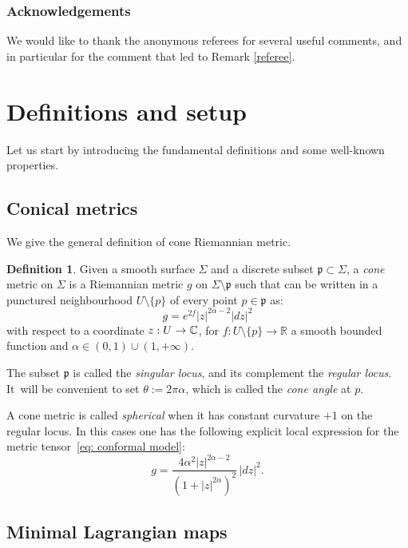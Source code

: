 \documentclass[11pt]{article}
\theoremstyle{definition}
\newtheorem{defi}[cor]{Definition}
\newcommand{\R}{{\mathbb R}}
\begin{document}
\subsubsection*{Acknowledgements}
We would like to thank the anonymous referees for several useful comments, and in particular for the comment that led to Remark \ref{referee}.

\section{Definitions and setup}

Let us start by introducing the fundamental definitions and some well-known properties.

\subsection{Conical metrics}
We give the general definition of cone Riemannian metric.

\begin{defi} \label{defi cone sing}
Given a smooth surface $\Sigma$ and a discrete subset $\mathfrak p\subset \Sigma$, a \emph{cone} metric on $\Sigma$ is a Riemannian metric $g$ on $\Sigma\setminus \mathfrak p$ such that can be written in a punctured neighbourhood $U\setminus\{p\}$ of every point $p\in \mathfrak p$ as:
\begin{equation} \label{eq: conformal model}
g=e^{2f}|z|^{2\alpha-2}|dz|^2
\end{equation}
with respect to a coordinate $z:U\to{\mathbb C}$, for $f:U\setminus \{p\}\to\R$ a smooth bounded function and $\alpha\in (0,1)\cup (1,+\infty)$.
\end{defi}

The subset $\mathfrak p$ is called the \emph{singular locus}, and its complement the \emph{regular locus}. It~will be convenient to set $\theta:=2\pi\alpha$, which is called the \emph{cone angle} at $p$.

A cone metric is called \emph{spherical} when it has constant curvature $+1$ on the regular locus. In this cases one has the following explicit local expression for the metric tensor~\eqref{eq: conformal model}:
\begin{equation}\label{eq:spherical cone metric}
g=\frac{4\alpha^2|z|^{2\alpha-2}}{(1+|z|^{2\alpha})^2}\,|dz|^2.
\end{equation}

\subsection{Minimal Lagrangian maps}
\end{document}
